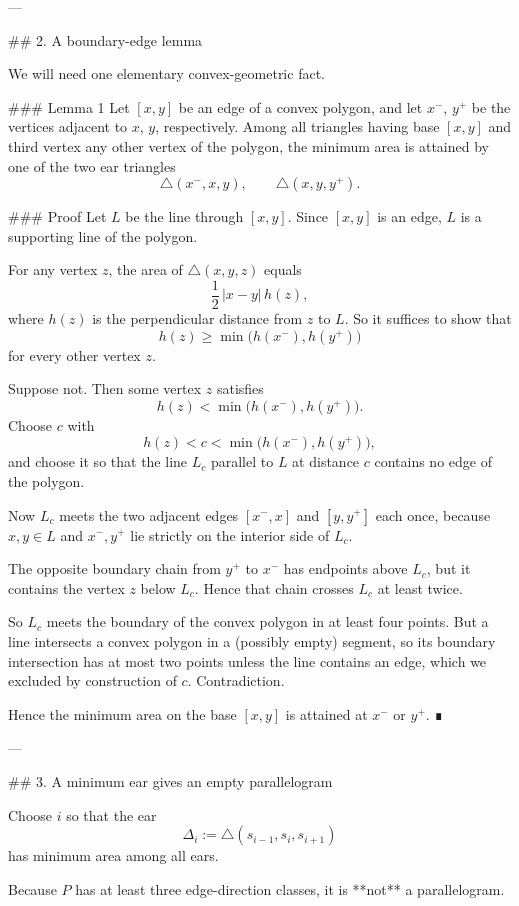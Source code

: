 ---

## 2. A boundary-edge lemma

We will need one elementary convex-geometric fact.

### Lemma 1
Let \([x,y]\) be an edge of a convex polygon, and let \(x^{-}\), \(y^{+}\) be the vertices adjacent to \(x\), \(y\), respectively. Among all triangles having base \([x,y]\) and third vertex any other vertex of the polygon, the minimum area is attained by one of the two ear triangles
\[
\triangle(x^{-},x,y),\qquad \triangle(x,y,y^{+}).
\]

### Proof
Let \(L\) be the line through \([x,y]\). Since \([x,y]\) is an edge, \(L\) is a supporting line of the polygon.

For any vertex \(z\), the area of \(\triangle(x,y,z)\) equals
\[
\frac12\,|x-y|\,h(z),
\]
where \(h(z)\) is the perpendicular distance from \(z\) to \(L\). So it suffices to show that
\[
h(z)\ge \min\bigl(h(x^-),h(y^+)\bigr)
\]
for every other vertex \(z\).

Suppose not. Then some vertex \(z\) satisfies
\[
h(z)<\min\bigl(h(x^-),h(y^+)\bigr).
\]
Choose \(c\) with
\[
h(z)<c<\min\bigl(h(x^-),h(y^+)\bigr),
\]
and choose it so that the line \(L_c\) parallel to \(L\) at distance \(c\) contains no edge of the polygon.

Now \(L_c\) meets the two adjacent edges \([x^-,x]\) and \([y,y^+]\) each once, because \(x,y\in L\) and \(x^-,y^+\) lie strictly on the interior side of \(L_c\).

The opposite boundary chain from \(y^+\) to \(x^-\) has endpoints above \(L_c\), but it contains the vertex \(z\) below \(L_c\). Hence that chain crosses \(L_c\) at least twice.

So \(L_c\) meets the boundary of the convex polygon in at least four points. But a line intersects a convex polygon in a (possibly empty) segment, so its boundary intersection has at most two points unless the line contains an edge, which we excluded by construction of \(c\). Contradiction.

Hence the minimum area on the base \([x,y]\) is attained at \(x^{-}\) or \(y^{+}\). ∎

---

## 3. A minimum ear gives an empty parallelogram

Choose \(i\) so that the ear
\[
\Delta_i:=\triangle(s_{i-1},s_i,s_{i+1})
\]
has minimum area among all ears.

Because \(P\) has at least three edge-direction classes, it is **not** a parallelogram.

